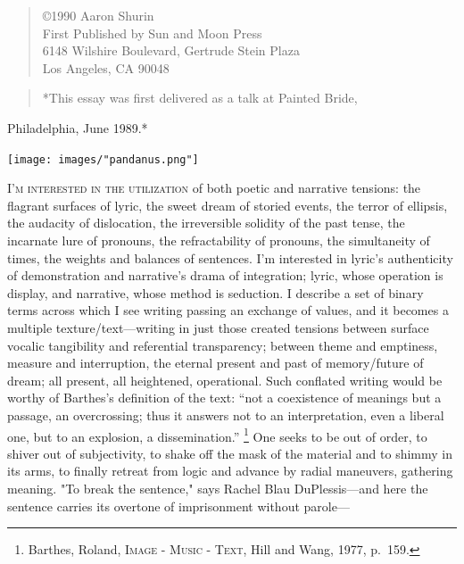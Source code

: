 \documentclass[
]{memoir}
\begin{document}
\begin{verse}
©1990 Aaron Shurin\\
First Published by Sun and Moon Press\\
6148 Wilshire Boulevard, Gertrude Stein Plaza\\
Los Angeles, CA 90048\\
\end{verse}

\begin{verse}
*This essay was first delivered as a talk at Painted Bride,\\
\end{verse}

Philadelphia, June 1989.*

\begin{center}\texttt{[image: images/"pandanus.png"]}\end{center}

\lettrine[lines=3, findent=0em, nindent=0.1em, lhang=0]{I}{’m interested in the utilization}
of both poetic and narrative tensions: the flagrant surfaces of lyric,
the sweet dream of storied events, the terror of ellipsis, the audacity
of dislocation, the irreversible solidity of the past tense, the
incarnate lure of pronouns, the refractability of pronouns, the
simultaneity of times, the weights and balances of sentences. I'm
interested in lyric's authenticity of demonstration and narrative's
drama of integration; lyric, whose operation is display, and narrative,
whose method is seduction. I describe a set of binary terms across which
I see writing passing an exchange of values, and it becomes a multiple
texture/text---writing in just those created tensions between surface
vocalic tangibility and referential transparency; between theme and
emptiness, measure and interruption, the eternal present and past of
memory/future of dream; all present, all heightened, operational. Such
conflated writing would be worthy of Barthes's definition of the text:
``not a coexistence of meanings but a passage, an overcrossing; thus it
answers not to an interpretation, even a liberal one, but to an
explosion, a dissemination.'' \footnote{Barthes, Roland, \textsc{Image -
  Music - Text}, Hill and Wang, 1977, p.~159.} One seeks to be out of
order, to shiver out of subjectivity, to shake off the mask of the
material and to shimmy in its arms, to finally retreat from logic and
advance by radial maneuvers, gathering meaning. "To break the sentence,"
says Rachel Blau DuPlessis---and here the sentence carries its overtone
of imprisonment without parole---
\end{document}
